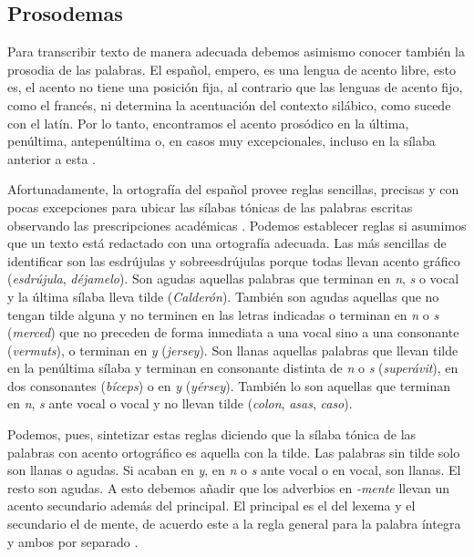 \subsection{Prosodemas}\label{sec:acento}
Para transcribir texto de manera adecuada debemos asimismo conocer también la prosodia de las palabras. El español, empero, es una lengua de acento libre, esto es, el acento no tiene una posición fija, al contrario que las lenguas de acento fijo, como el francés, ni determina la acentuación del contexto silábico, como sucede con el latín. Por lo tanto, encontramos el acento prosódico en la última, penúltima, antepenúltima o, en casos muy excepcionales, incluso en la sílaba anterior a esta \parencite[24]{rae2010}. 

 Afortunadamente, la ortografía del español provee reglas sencillas, precisas y con pocas excepciones para ubicar las sílabas tónicas de las palabras escritas observando las prescripciones académicas \parencite[39-40]{rae2012}. Podemos establecer  reglas si asumimos que un texto está redactado con una ortografía adecuada. Las más sencillas de identificar son las esdrújulas y sobreesdrújulas porque todas llevan acento gráfico (\textit{esdrújula}, \textit{déjamelo}). Son agudas aquellas palabras que terminan en \textit{n}, \textit{s} o vocal y la última sílaba lleva tilde (\textit{Calderón}). También son agudas aquellas que no tengan tilde alguna y no terminen en las letras indicadas o terminan en \textit{n} o \textit{s} (\textit{merced}) que no preceden de forma inmediata a una vocal sino a una consonante (\textit{vermuts}), o terminan en \textit{y} (\textit{jersey}). Son llanas aquellas palabras que llevan tilde en la penúltima sílaba y terminan en consonante distinta de \textit{n} o \textit{s} (\textit{superávit}), en dos consonantes (\textit{bíceps}) o en \textit{y} (\textit{yérsey}). También lo son aquellas que terminan en \textit{n}, \textit{s} ante vocal o vocal y no llevan tilde (\textit{colon}, \textit{asas}, \textit{caso}). 

Podemos, pues, sintetizar estas reglas diciendo que la sílaba tónica de las palabras con acento ortográfico es aquella con la tilde. Las palabras sin tilde solo son llanas o agudas. Si acaban en \textit{y}, en \textit{n} o \textit{s} ante vocal o en vocal, son llanas. El resto son agudas. A esto debemos añadir que los adverbios en \textit{-mente} llevan un acento secundario además del principal. El principal es el del lexema y el secundario el de mente, de acuerdo este a la regla general para la palabra íntegra y ambos por separado \parencite[26]{quilis2013}. 
